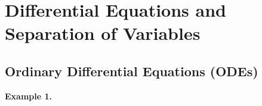 

\chapter{Differential Equations and Separation of Variables}

\bigbreak

\section{Ordinary Differential Equations (ODEs) }

{\bf Example 1.} 